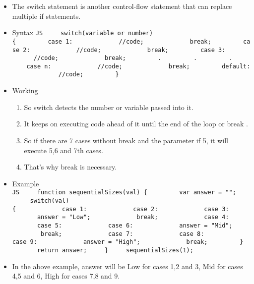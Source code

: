 \documentclass[
  paper=a4,
  ,captions=tableheading
]{scrartcl}
\providecommand{\tightlist}{%
  \setlength{\itemsep}{0pt}\setlength{\parskip}{0pt}}
\begin{document}
\begin{itemize}
\tightlist
\item
  The switch statement is another control-flow statement that can
  replace multiple if statements.
\item
  Syntax
  \texttt{JS\ \ \ \ \ switch(variable\ or\ number)\{\ \ \ \ \ \ \ \ \ case\ 1:\ \ \ \ \ \ \ \ \ \ \ \ \ //code;\ \ \ \ \ \ \ \ \ \ \ \ \ break;\ \ \ \ \ \ \ \ \ case\ 2:\ \ \ \ \ \ \ \ \ \ \ \ \ //code;\ \ \ \ \ \ \ \ \ \ \ \ \ break;\ \ \ \ \ \ \ \ \ case\ 3:\ \ \ \ \ \ \ \ \ \ \ \ \ //code;\ \ \ \ \ \ \ \ \ \ \ \ \ break;\ \ \ \ \ \ \ \ \ .\ \ \ \ \ \ \ \ \ .\ \ \ \ \ \ \ \ \ .\ \ \ \ \ \ \ \ \ case\ n:\ \ \ \ \ \ \ \ \ \ \ \ \ //code;\ \ \ \ \ \ \ \ \ \ \ \ \ break;\ \ \ \ \ \ \ \ \ default:\ \ \ \ \ \ \ \ \ \ \ \ \ //code;\ \ \ \ \ \ \ \ \ \}}
\item
  Working

  \begin{enumerate}
  \def\labelenumi{\arabic{enumi}.}
  \tightlist
  \item
    So switch detects the number or variable passed into it.
  \item
    It keeps on executing code ahead of it until the end of the loop or
    break .
  \item
    So if there are 7 cases without break and the parameter if 5, it
    will execute 5,6 and 7th cases.
  \item
    That's why break is necessary.
  \end{enumerate}
\item
  Example
  \texttt{JS\ \ \ \ \ function\ sequentialSizes(val)\ \{\ \ \ \ \ \ \ \ \ var\ answer\ =\ "";\ \ \ \ \ \ \ \ \ switch(val)\{\ \ \ \ \ \ \ \ \ \ \ \ \ case\ 1:\ \ \ \ \ \ \ \ \ \ \ \ \ case\ 2:\ \ \ \ \ \ \ \ \ \ \ \ \ case\ 3:\ \ \ \ \ \ \ \ \ \ \ \ \ answer\ =\ "Low";\ \ \ \ \ \ \ \ \ \ \ \ \ break;\ \ \ \ \ \ \ \ \ \ \ \ \ case\ 4:\ \ \ \ \ \ \ \ \ \ \ \ \ case\ 5:\ \ \ \ \ \ \ \ \ \ \ \ \ case\ 6:\ \ \ \ \ \ \ \ \ \ \ \ \ answer\ =\ "Mid";\ \ \ \ \ \ \ \ \ \ \ \ \ break;\ \ \ \ \ \ \ \ \ \ \ \ \ case\ 7:\ \ \ \ \ \ \ \ \ \ \ \ \ case\ 8:\ \ \ \ \ \ \ \ \ \ \ \ \ case\ 9:\ \ \ \ \ \ \ \ \ \ \ \ \ answer\ =\ "High";\ \ \ \ \ \ \ \ \ \ \ \ \ break;\ \ \ \ \ \ \ \ \ \}\ \ \ \ \ \ \ \ \ return\ answer;\ \ \ \ \ \}\ \ \ \ \ sequentialSizes(1);}
\item
  In the above example, answer will be Low for cases 1,2 and 3, Mid for
  cases 4,5 and 6, High for cases 7,8 and 9.
\end{itemize}
\end{document}
